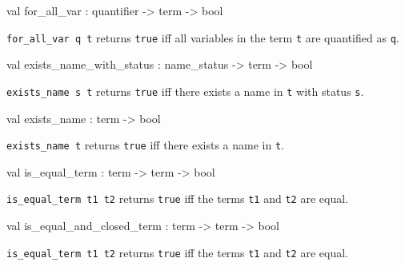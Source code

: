 \label{val:Term.for-underscoreall-underscorevar}\begin{ocamldoccode}
val for_all_var : quantifier -> term -> bool
\end{ocamldoccode}
\begin{ocamldocdescription}
{\tt{for\_all\_var q t}} returns {\tt{true}} iff all variables in the term {\tt{t}} are quantified as {\tt{q}}.


\end{ocamldocdescription}




\label{val:Term.exists-underscorename-underscorewith-underscorestatus}\begin{ocamldoccode}
val exists_name_with_status : name_status -> term -> bool
\end{ocamldoccode}
\begin{ocamldocdescription}
{\tt{exists\_name s t}} returns {\tt{true}} iff there exists a name in {\tt{t}} with status {\tt{s}}.


\end{ocamldocdescription}




\label{val:Term.exists-underscorename}\begin{ocamldoccode}
val exists_name : term -> bool
\end{ocamldoccode}
\begin{ocamldocdescription}
{\tt{exists\_name t}} returns {\tt{true}} iff there exists a name in {\tt{t}}.


\end{ocamldocdescription}




\label{val:Term.is-underscoreequal-underscoreterm}\begin{ocamldoccode}
val is_equal_term : term -> term -> bool
\end{ocamldoccode}
\begin{ocamldocdescription}
{\tt{is\_equal\_term t1 t2}} returns {\tt{true}} iff the terms {\tt{t1}} and {\tt{t2}} are equal.


\end{ocamldocdescription}




\label{val:Term.is-underscoreequal-underscoreand-underscoreclosed-underscoreterm}\begin{ocamldoccode}
val is_equal_and_closed_term : term -> term -> bool
\end{ocamldoccode}
\begin{ocamldocdescription}
{\tt{is\_equal\_term t1 t2}} returns {\tt{true}} iff the terms {\tt{t1}} and {\tt{t2}} are equal.


\end{ocamldocdescription}




